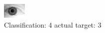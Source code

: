 \begin{figure}[h!]
\begin{center}
\includegraphics[width=0.60\columnwidth]{figures/ID2179_class_4_target_3.png}
\end{center}
\caption{ Classification: 4 actual target: 3}
\label{fig:ID2179_class_4_target_3}
\end{figure}
